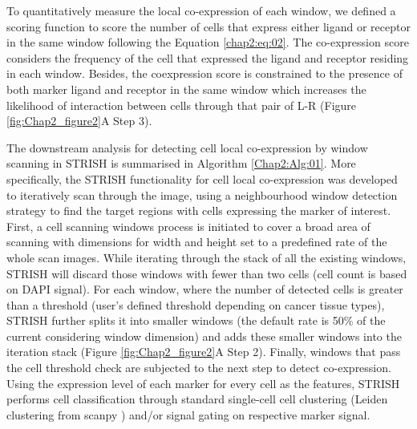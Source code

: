 To quantitatively measure the local co-expression of each window, we defined a scoring function to score the number of cells that express either ligand or receptor in the same window following the Equation \ref{chap2:eq:02}. The co-expression score considers the frequency of the cell that expressed the ligand and receptor residing in each window. Besides, the coexpression score is constrained to the presence of both marker ligand and receptor in the same window which increases the likelihood of interaction between cells through that pair of L-R (Figure \ref{fig:Chap2_figure2}A Step 3). 
   
The downstream analysis for detecting cell local co-expression by window scanning in STRISH is summarised in Algorithm \ref{Chap2:Alg:01}. More specifically, the STRISH functionality for cell local co-expression was developed to iteratively scan through the image, using a neighbourhood window detection strategy to find the target regions with cells expressing the marker of interest. First, a cell scanning windows process is initiated to cover a broad area of scanning with dimensions for width and height set to a predefined rate of the whole scan images. While iterating through the stack of all the existing windows, STRISH will discard those windows with fewer than two cells (cell count is based on DAPI signal). For each window, where the number of detected cells is greater than a threshold (user’s defined threshold depending on cancer tissue types), STRISH further splits it into smaller windows (the default rate is 50\% of the current considering window dimension) and adds these smaller windows into the iteration stack (Figure \ref{fig:Chap2_figure2}A Step 2). Finally, windows that pass the cell threshold check are subjected to the next step to detect co-expression. Using the expression level of each marker for every cell as the features, STRISH performs cell classification through standard single-cell cell clustering (\ie Leiden clustering from scanpy \cite{wolf2018scanpy}) and/or signal gating on respective marker signal.

